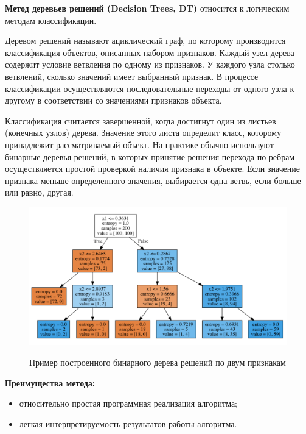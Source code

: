 \documentclass[utf8x, 14pt, oneside, a4paper]{article}
\begin{document}
	{\bf Метод деревьев решений (Decision Trees, DT)} относится к логическим методам классификации. 
	
	Деревом решений называют ациклический граф, по которому производится классификация объектов, описанных набором признаков. Каждый узел дерева содержит условие ветвления по одному из признаков.  У каждого узла столько ветвлений, сколько значений имеет выбранный  признак. В процессе классификации осуществляются последовательные переходы от одного узла к другому в соответствии со значениями  признаков объекта. 
	
	Классификация считается завершенной, когда достигнут один из листьев (конечных  узлов) дерева. Значение этого листа  определит класс, которому принадлежит рассматриваемый объект. На  практике обычно используют бинарные деревья решений, в которых принятие решения перехода по ребрам осуществляется простой  проверкой наличия признака в объекте. Если значение признака меньше определенного значения, выбирается одна ветвь, если больше или равно, другая.
	
	\begin{figure}[h!]
		\begin{center}
			{\includegraphics[scale = 0.45]{img/tree.png}}
		\end{center}
		\caption{Пример построенного бинарного дерева решений по двум признакам}
		\label{ris:tree}
	\end{figure}

	\begin{flushleft}
		{\bf Преимущества метода:}
	\end{flushleft}

	\begin{itemize}
		\item относительно простая программная реализация алгоритма;
		\item легкая интерпретируемость результатов работы алгоритма.
	\end{itemize}
\end{document}
